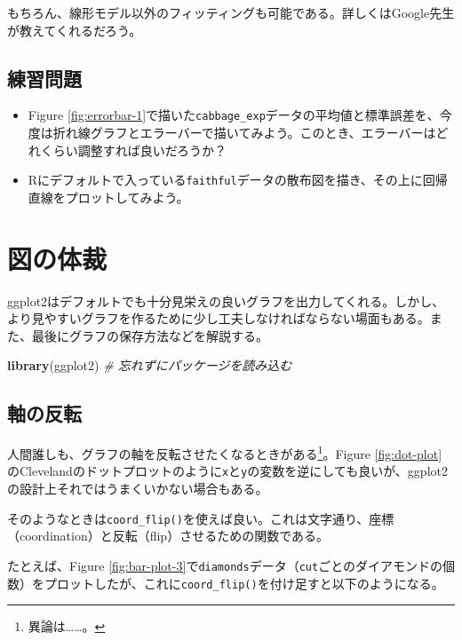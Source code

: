 \documentclass[]{book}
\newenvironment{Shaded}{\begin{snugshade}}{\end{snugshade}}
\newcommand{\KeywordTok}[1]{\textcolor[rgb]{0.13,0.29,0.53}{\textbf{#1}}}
\newcommand{\CommentTok}[1]{\textcolor[rgb]{0.56,0.35,0.01}{\textit{#1}}}
\newcommand{\NormalTok}[1]{#1}
\let\rmarkdownfootnote\footnote%
\def\footnote{\protect\rmarkdownfootnote}
\begin{document}
もちろん、線形モデル以外のフィッティングも可能である。詳しくはGoogle先生が教えてくれるだろう。

\section{練習問題}\label{-4}

\begin{itemize}
\item
  Figure
  \ref{fig:errorbar-1}で描いた\texttt{cabbage\_exp}データの平均値と標準誤差を、今度は折れ線グラフとエラーバーで描いてみよう。このとき、エラーバーはどれくらい調整すれば良いだろうか？
\item
  Rにデフォルトで入っている\texttt{faithful}データの散布図を描き、その上に回帰直線をプロットしてみよう。
\end{itemize}

\chapter{図の体裁}\label{appearance}

ggplot2はデフォルトでも十分見栄えの良いグラフを出力してくれる。しかし、より見やすいグラフを作るために少し工夫しなければならない場面もある。また、最後にグラフの保存方法などを解説する。

\begin{Shaded}
\begin{Highlighting}[]
\KeywordTok{library}\NormalTok{(ggplot2) }\CommentTok{# 忘れずにパッケージを読み込む}
\end{Highlighting}
\end{Shaded}

\section{軸の反転}

人間誰しも、グラフの軸を反転させたくなるときがある\footnote{異論は\ldots{}\ldots{}。}。Figure
\ref{fig:dot-plot}
のClevelandのドットプロットのように\texttt{x}と\texttt{y}の変数を逆にしても良いが、ggplot2の設計上それではうまくいかない場合もある。

そのようなときは\texttt{coord\_flip()}を使えば良い。これは文字通り、座標（coordination）と反転（flip）させるための関数である。

たとえば、Figure
\ref{fig:bar-plot-3}で\texttt{diamonds}データ（\texttt{cut}ごとのダイアモンドの個数）をプロットしたが、これに\texttt{coord\_flip()}を付け足すと以下のようになる。
\end{document}
